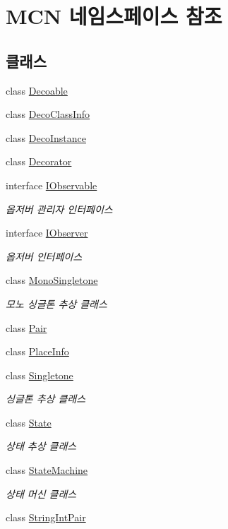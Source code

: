 \hypertarget{namespace_m_c_n}{}\section{M\+CN 네임스페이스 참조}
\label{namespace_m_c_n}
\subsection*{클래스}
\begin{DoxyCompactItemize}
\item 
class \hyperlink{class_m_c_n_1_1_decoable}{Decoable}
\item 
class \hyperlink{class_m_c_n_1_1_deco_class_info}{Deco\+Class\+Info}
\item 
class \hyperlink{class_m_c_n_1_1_deco_instance}{Deco\+Instance}
\item 
class \hyperlink{class_m_c_n_1_1_decorator}{Decorator}
\item 
interface \hyperlink{interface_m_c_n_1_1_i_observable}{I\+Observable}
\begin{DoxyCompactList}\small\item\em 옵저버 관리자 인터페이스 \end{DoxyCompactList}\item 
interface \hyperlink{interface_m_c_n_1_1_i_observer}{I\+Observer}
\begin{DoxyCompactList}\small\item\em 옵저버 인터페이스 \end{DoxyCompactList}\item 
class \hyperlink{class_m_c_n_1_1_mono_singletone}{Mono\+Singletone}
\begin{DoxyCompactList}\small\item\em 모노 싱글톤 추상 클래스 \end{DoxyCompactList}\item 
class \hyperlink{class_m_c_n_1_1_pair}{Pair}
\item 
class \hyperlink{class_m_c_n_1_1_place_info}{Place\+Info}
\item 
class \hyperlink{class_m_c_n_1_1_singletone}{Singletone}
\begin{DoxyCompactList}\small\item\em 싱글톤 추상 클래스 \end{DoxyCompactList}\item 
class \hyperlink{class_m_c_n_1_1_state}{State}
\begin{DoxyCompactList}\small\item\em 상태 추상 클래스 \end{DoxyCompactList}\item 
class \hyperlink{class_m_c_n_1_1_state_machine}{State\+Machine}
\begin{DoxyCompactList}\small\item\em 상태 머신 클래스 \end{DoxyCompactList}\item 
class \hyperlink{class_m_c_n_1_1_string_int_pair}{String\+Int\+Pair}
\end{DoxyCompactItemize}
